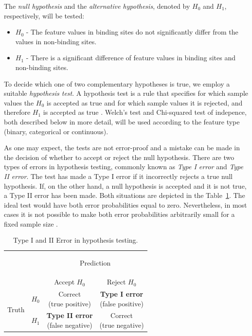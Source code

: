 The \textit{null hypothesis} and the \textit{alternative hypothesis}, denoted by $H_{0}$ and $H_{1}$, respectively, will be tested:

\begin{itemize}
\item \textbf{$H_{0}$} - The feature values in binding sites do not significantly differ from the values in non-binding sites.
\item \textbf{$H_{1}$} - There is a significant difference of feature values in binding sites and non-binding sites.
\end{itemize}

To decide which one of two complementary hypotheses is true, we employ a suitable \textit{hypothesis test}. A hypothesis test is a rule that specifies for which sample values the $H_{0}$ is accepted as true and for which sample values it is rejected, and therefore $H_{1}$ is accepted as true \cite{casella}. Welch's test and Chi-squared test of indepence, both described below in more detail, will be used according to the feature type (binary, categorical or continuous). 

As one may expect, the tests are not error-proof and a mistake can be made in the decision of whether to accept or reject the null hypothesis. There are two types of errors in hypothesis testing, commonly known as \textit{Type I error} and \textit{Type II error}. The test has made a Type I error if it incorrectly rejects a true null hypothesis. If, on the other hand, a null hypothesis is accepted and it is not true, a Type II error has been made. Both situations are depicted in the Table~\ref{tab:hypothesis_testing_errors}. The ideal test would have both error probabilities equal to zero. Nevertheless, in most cases it is not possible to make both error probabilities arbitrarily small for a fixed sample size \cite{casella}.

\begin{table}[!htbp]
\centering
\renewcommand{\arraystretch}{2.5}
\begin{tabular}{l|l|c|c|}
\multicolumn{2}{c}{}&\multicolumn{2}{c}{\begin{large}Prediction \end{large}}\\
\cline{3-4}
\multicolumn{2}{c|}{}&Accept $H_{0}$&Reject $H_{0}$\\
\cline{2-4}
\multirow{2}{*}{\begin{large}Truth\end{large}}& \textbf{$H_{0}$} & \shortstack{Correct\\(true positive)} & \shortstack{\textbf{Type I error}\\(false positive)}\\
\cline{2-4}
& \textbf{$H_{1}$} & \shortstack{\textbf{Type II error}\\(false negative)} & \shortstack{Correct\\(true negative)} \\
\cline{2-4}
\end{tabular}
\caption{Type I and II Error in hypothesis testing.}\label{tab:hypothesis_testing_errors}
\end{table}

